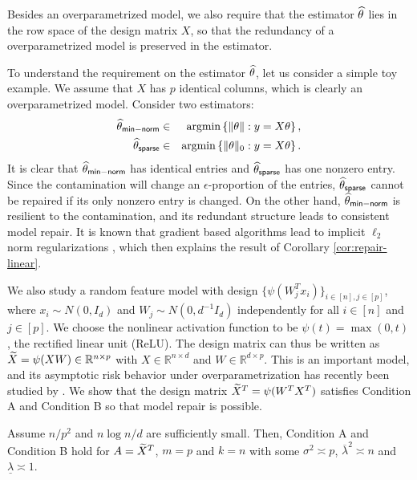 Besides an overparametrized model, we also require that the estimator $\widehat{\theta}$ lies in the row space of the design matrix $X$, so that the redundancy of a overparametrized model is preserved in the estimator.
\begin{remark}
To understand the requirement on the estimator $\widehat{\theta}$, let us consider a simple toy example. We assume that $X$ has $p$ identical columns, which is clearly an overparametrized model. Consider two estimators:
\begin{eqnarray*}
\wh{\theta}_{\sf min-norm} &\in& \argmin\left\{\|\theta\|: y=X\theta\right\}, \\
\wh{\theta}_{\sf sparse} &\in& \argmin\left\{\|\theta\|_0: y=X\theta\right\}.
\end{eqnarray*}
It is clear that $\widehat{\theta}_{\sf min-norm}$ has identical entries and $\widehat{\theta}_{\sf sparse}$ has one nonzero entry. Since the contamination will change an $\epsilon$-proportion of the entries, $\widehat{\theta}_{\sf sparse}$ cannot be repaired if its only nonzero entry is changed. On the other hand, $\widehat{\theta}_{\sf min-norm}$ is resilient to the contamination, and its redundant structure leads to consistent model repair. It is known that gradient based algorithms lead to implicit $\ell_2$ norm regularizations \citep{neyshabur2014search}, which then explains the result of Corollary \ref{cor:repair-linear}.
\end{remark}


We also study a random feature model with design $\{\psi(W_j^Tx_i)\}_{i\in[n],j\in[p]}$, where $x_i\sim N(0,I_d)$ and $W_j\sim N(0,d^{-1}I_d)$ independently for all $i\in[n]$ and $j\in[p]$. We choose the nonlinear activation function to be $\psi(t)=\max(0,t)$, the rectified linear unit (ReLU). The design matrix can thus be written as $\widetilde{X}=\psi(XW)\in\mathbb{R}^{n\times p}$ with $X\in\mathbb{R}^{n\times d}$ and $W\in\mathbb{R}^{d\times p}$. This is an important model, and its asymptotic risk behavior under overparametrization has recently been studied by \cite{mei2019generalization}. We show that the design matrix $\widetilde{X}^T=\psi(W^TX^T)$ satisfies Condition A and Condition B so that model repair is possible.

\begin{lemma}\label{lem:design-rf-relu}
Assume $n/p^2$ and $n\log n/d$ are sufficiently small. Then, Condition A and Condition B hold for $A=\widetilde{X}^T$, $m=p$ and $k=n$ with some $\sigma^2\asymp p$, $\overline{\lambda}^2\asymp n$ and $\underline{\lambda}\asymp 1$.
\end{lemma}



